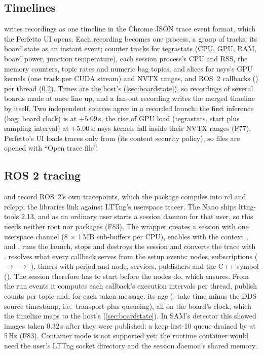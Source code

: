 \documentclass[11pt,a4paper]{article}
\newcommand{\finding}[1]{\textsf{\small F#1}}
\begin{document}
\subsection{Timelines}\label{sec:timeline}
 writes recordings as one timeline in the Chrome JSON trace event format, which the Perfetto
UI opens. Each recording becomes one process, a group of tracks: its board state as an instant event; counter tracks
for tegrastats (CPU, GPU, RAM, board power, junction temperature), each session process's CPU and RSS, the memory
counters, topic rates and numeric bag topics; and slices for nsys's GPU kernels (one track per CUDA stream) and NVTX
ranges, and ROS~2 callbacks () per thread (\cref{sec:rostrace}). Times are the host's (\cref{sec:boardstate}), so recordings of several boards made at once line up, and a
fan-out recording writes the merged timeline by itself. Two independent sources agree in a recorded launch: the
first inference (bag, board clock) is at $+5.09$\,s, the rise of GPU load (tegrastats, start plus sampling interval)
at $+5.00$\,s; nsys kernels fall inside their NVTX ranges (\finding{77}). Perfetto's UI loads  traces only
from  (its content security policy), so files are opened with ``Open trace file''.

\subsection{ROS 2 tracing}\label{sec:rostrace}
 and  record ROS~2's own tracepoints, which the 
package compiles into rcl and rclcpp; the libraries link against LTTng's userspace tracer. The Nano ships lttng-tools
2.13, and  as an ordinary user starts a session daemon for that user, so this needs neither root nor
packages (\finding{83}). The wrapper creates a session with one userspace channel (8 $\times$ 1\,MB sub-buffers per
CPU), enables  with the context ,  and , runs the launch, stops and
destroys the session and converts the trace with .  resolves what every
callback serves from the setup events: nodes, subscriptions ( $\to$
 $\to$ ), timers with period and node,
services, publishers and the C++ symbol (). The session therefore has to start before
the nodes do, which  ensures. From the run events it computes each callback's execution intervals per
thread, publish counts per topic and, for each taken message, its age (: take time minus the DDS source
timestamp, i.e.\ transport plus queueing), all on the board's clock, which the timeline maps to the host's
(\cref{sec:boardstate}). In SAM's detector this showed images taken 0.32\,s after they were published: a keep-last-10
queue drained by  at 5\,Hz (\finding{83}). Container mode is not supported yet; the runtime container
would need the user's LTTng socket directory and the session daemon's shared memory.
\end{document}
